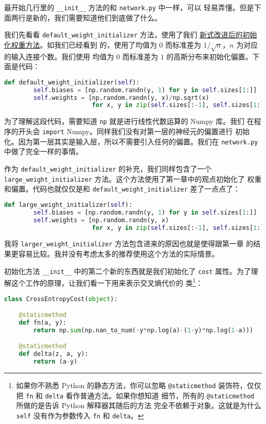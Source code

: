 最开始几行里的 \lstinline!__init__! 方法的和 \lstinline!network.py! 中一样，可以
轻易弄懂。但是下面两行是新的，我们需要知道他们到底做了什么。

我们先看看 \lstinline!default_weight_initializer! 方法，使用了我们%
\hyperref[sec:weight_initialization]{新式改进后的初始化权重方法}。如我们已经看到
的，使用了均值为 $0$ 而标准差为 $1/\sqrt{n}$，$n$ 为对应的输入连接个数。我们使用
均值为 $0$ 而标准差为 $1$ 的高斯分布来初始化偏置。下面是代码：
\begin{lstlisting}[language=Python]
def default_weight_initializer(self):
        self.biases = [np.random.randn(y, 1) for y in self.sizes[1:]]
        self.weights = [np.random.randn(y, x)/np.sqrt(x) 
                        for x, y in zip(self.sizes[:-1], self.sizes[1:])]
\end{lstlisting}

为了理解这段代码，需要知道 \lstinline!np! 就是进行线性代数运算的 Numpy 库。我们
在程序的开头会 \lstinline!import! Numpy。同样我们没有对第一层的神经元的偏置进行
初始化。因为第一层其实是输入层，所以不需要引入任何的偏置。我们在
\lstinline!network.py! 中做了完全一样的事情。

作为 \lstinline!default_weight_initializer! 的补充，我们同样包含了一个
\lstinline!large_weight_initializer! 方法。这个方法使用了第一章中的观点初始化了
权重和偏置。代码也就仅仅是和 \lstinline!default_weight_initializer! 差了一点点了：
\begin{lstlisting}[language=Python]
def large_weight_initializer(self):
        self.biases = [np.random.randn(y, 1) for y in self.sizes[1:]]
        self.weights = [np.random.randn(y, x) 
                        for x, y in zip(self.sizes[:-1], self.sizes[1:])]
\end{lstlisting}

我将 \lstinline!larger_weight_initializer! 方法包含进来的原因也就是使得跟第一章
的结果更容易比较。我并没有考虑太多的推荐使用这个方法的实际情景。

初始化方法 \lstinline!__init__! 中的第二个新的东西就是我们初始化了
\lstinline!cost! 属性。为了理解这个工作的原理，让我们看一下用来表示交叉熵代价的
类\footnote{如果你不熟悉 Python 的静态方法，你可以忽略 \lstinline!@staticmethod!
  装饰符，仅仅把 \lstinline!fn! 和 \lstinline!delta! 看作普通方法。如果你想知道
  细节，所有的 \lstinline!@staticmethod! 所做的是告诉 Python 解释器其随后的方法
  完全不依赖于对象。这就是为什么 \lstinline!self! 没有作为参数传入
  \lstinline!fn!  和 \lstinline!delta!。}：
\begin{lstlisting}[language=Python]
class CrossEntropyCost(object):

    @staticmethod
    def fn(a, y):
        return np.sum(np.nan_to_num(-y*np.log(a)-(1-y)*np.log(1-a)))

    @staticmethod
    def delta(z, a, y):
        return (a-y)
\end{lstlisting}

